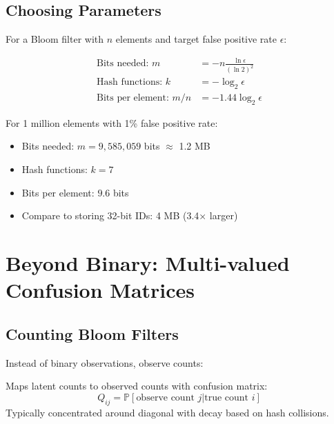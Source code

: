 \subsection{Choosing Parameters}

For a Bloom filter with $n$ elements and target false positive rate $\epsilon$:

\begin{theorem}
\begin{align}
\text{Bits needed: } m &= -n \frac{\ln \epsilon}{(\ln 2)^2} \\
\text{Hash functions: } k &= -\log_2 \epsilon \\
\text{Bits per element: } m/n &= -1.44 \log_2 \epsilon
\end{align}
\end{theorem}

\begin{example}
For 1 million elements with 1\% false positive rate:
\begin{itemize}
\item Bits needed: $m = 9,585,059$ bits $\approx$ 1.2 MB
\item Hash functions: $k = 7$
\item Bits per element: $9.6$ bits
\item Compare to storing 32-bit IDs: 4 MB (3.4× larger)
\end{itemize}
\end{example}

\section{Beyond Binary: Multi-valued Confusion Matrices}

\subsection{Counting Bloom Filters}

Instead of binary observations, observe counts:

\begin{definition}
Maps latent counts to observed counts with confusion matrix:
\begin{equation}
Q_{ij} = \mathbb{P}[\text{observe count } j | \text{true count } i]
\end{equation}
Typically concentrated around diagonal with decay based on hash collisions.
\end{definition}

